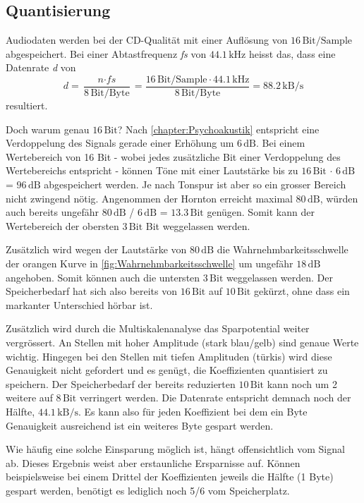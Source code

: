 \begin{refsection}
\subsection{Quantisierung}
\label{chapter=quantisierung}
Audiodaten werden bei der CD-Qualität mit einer Auflösung von $16\,\text{Bit/Sample}$ abgespeichert. 
Bei einer Abtastfrequenz \textit{fs} von $44.1\,\text{kHz}$ heisst das, dass eine Datenrate \textit{d} von 
\begin{equation}
\textit{d} = \frac{\textit{n} \cdot \textit{fs}}{8\,\text{Bit/Byte}} = \frac{16\,\text{Bit/Sample} \cdot 44.1\,\text{kHz}}{8\,\text{Bit/Byte}} = 88.2\,\text{kB/s}
\end{equation}
resultiert.

Doch warum genau $16\,\text{Bit}$?
Nach \autoref{chapter:Psychoakustik} entspricht eine Verdoppelung des Signals gerade einer Erhöhung um $6\,\text{dB}$.
Bei einem Wertebereich von 16 Bit - wobei jedes zusätzliche Bit einer Verdoppelung des Wertebereichs entspricht - können Töne mit einer Lautstärke bis zu
$16\,\text{Bit}$ $\cdot$ $6\,\text{dB}$ = $96\,\text{dB}$
abgespeichert werden.
Je nach Tonspur ist aber so ein grosser Bereich nicht zwingend nötig.
Angenommen der Hornton erreicht maximal $80\,\text{dB}$, würden auch bereits ungefähr
$80\,\text{dB}$ / $6\,\text{dB}$ =  $13.3\,\text{Bit}$
genügen. 
Somit kann der Wertebereich der obersten $3\,\text{Bit}$ Bit weggelassen werden.

Zusätzlich wird wegen der Lautstärke von $80\,\text{dB}$ die Wahrnehmbarkeitsschwelle der orangen Kurve in \autoref{fig:Wahrnehmbarkeitsschwelle} um ungefähr $18\,\text{dB}$ angehoben.
Somit können auch die untersten $3\,\text{Bit}$ weggelassen werden.
Der Speicherbedarf hat sich also bereits von $16\,\text{Bit}$ auf $10\,\text{Bit}$ gekürzt, ohne dass ein markanter Unterschied hörbar ist.

Zusätzlich wird durch die Multiskalenanalyse das Sparpotential weiter vergrössert.
An Stellen mit hoher Amplitude (stark blau/gelb) sind genaue Werte wichtig.
Hingegen bei den Stellen mit tiefen Amplituden (türkis) wird diese Genauigkeit nicht gefordert und es genügt, die Koeffizienten quantisiert zu speichern.
Der Speicherbedarf der bereits reduzierten $10\,\text{Bit}$ kann noch um 2 weitere auf $8\,\text{Bit}$ verringert werden.
Die Datenrate entspricht demnach noch der Hälfte, $44.1\,\text{kB/s}$.
Es kann also für jeden Koeffizient bei dem ein Byte Genauigkeit ausreichend ist ein weiteres Byte gespart werden.

Wie häufig eine solche Einsparung möglich ist, hängt offensichtlich vom Signal ab.
Dieses Ergebnis weist aber erstaunliche Ersparnisse auf.
Können beispielsweise bei einem Drittel der Koeffizienten jeweils die Hälfte (1 Byte) gespart werden, benötigt es lediglich noch 5/6 vom Speicherplatz.


\end{refsection}

